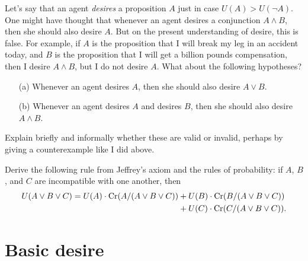 \begin{exercise2}
  Let's say that an agent \emph{desires} a proposition $A$ just in
  case $U(A) > U(\neg A)$. One might have thought that whenever an
  agent desires a conjunction $A \land B$, then she should also desire
  $A$. But on the present understanding of desire, this is false. For
  example, if $A$ is the proposition that I will break my leg in an
  accident today, and $B$ is the proposition that I will get a billion
  pounds compensation, then I desire $A \land B$, but I do not desire
  $A$. What about the following hypotheses?
  \begin{enumerate}
  \item[(a)] Whenever an agent desires $A$, then she should also desire $A
    \lor B$.
  \item[(b)] Whenever an agent desires $A$ and desires $B$, then she
    should also desire $A \land B$.
  \end{enumerate}
  Explain briefly and informally whether these are valid or invalid,
  perhaps by giving a counterexample like I did above. 

\end{exercise2}

\begin{exercise3}
  Derive the following rule from Jeffrey's axiom and the rules of probability: 
  if $A$, $B$, and $C$ are incompatible with one another, then 
  \begin{align*} U(A \lor B \lor C) =
  U(A)\cdot \text{Cr}(A/(A\lor B \lor C)) &+ U(B)\cdot \text{Cr}(B/(A \lor B \lor C))\\
  &+ U(C)\cdot\text{Cr}(C/(A \lor B\lor C)).
  \end{align*}
\end{exercise3}


\section{Basic desire}\label{sec:basic-desire}



